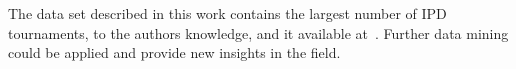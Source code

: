 \documentclass{article}
\begin{document}
The data set described in this work contains the largest number of IPD tournaments,
to the authors knowledge, and it available at~\cite{data}. Further data mining
could be applied and provide new insights in the field.








\end{document}
